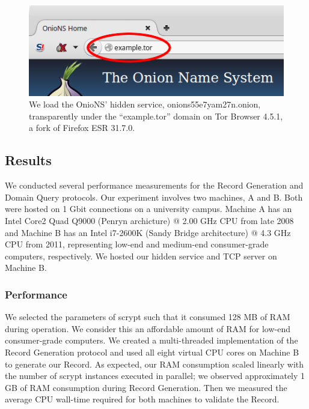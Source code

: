 \documentclass{sig-alternate}
\begin{document}
\begin{figure}[h]
	\centering
	\includegraphics[width=\linewidth]{../images/example.png}
	\caption{We load the OnioNS' hidden service, onions55e7yam27n.onion, transparently under the ``example.tor'' domain on Tor Browser 4.5.1, a fork of Firefox ESR 31.7.0.}
	\label{fig:cumulativeProbability}
\end{figure}

\subsection{Results}

We conducted several performance measurements for the Record Generation and Domain Query protocols. Our experiment involves two machines, A and B. Both were hosted on 1 Gbit connections on a university campus. Machine A has an Intel Core2 Quad Q9000 (Penryn archicture) @ 2.00 GHz CPU from late 2008 and Machine B has an Intel i7-2600K (Sandy Bridge architecture) @ 4.3 GHz CPU from 2011, representing low-end and medium-end consumer-grade computers, respectively. We hosted our hidden service and TCP server on Machine B.

\subsubsection{Performance}

We selected the parameters of scrypt such that it consumed 128 MB of RAM during operation. We consider this an affordable amount of RAM for low-end consumer-grade computers. We created a multi-threaded implementation of the Record Generation protocol and used all eight virtual CPU cores on Machine B to generate our Record. As expected, our RAM consumption scaled linearly with the number of scrypt instances executed in parallel; we observed approximately 1 GB of RAM consumption during Record Generation. Then we measured the average CPU wall-time required for both machines to validate the Record.
\end{document}
